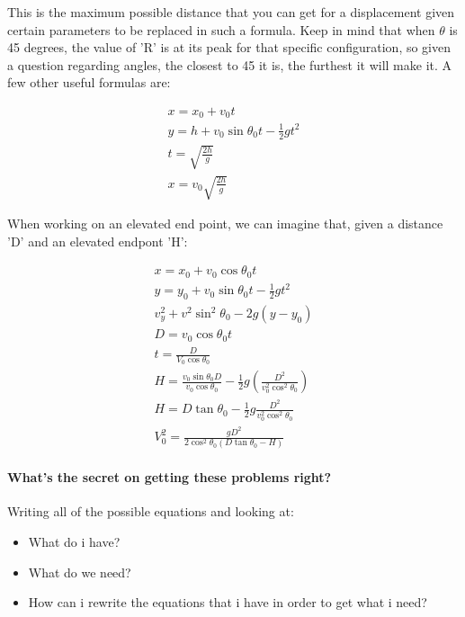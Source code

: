 \documentclass[11pt,fleqn]{book} %
\begin{document}
This is the maximum possible distance that you can get for a displacement given 
certain parameters to be replaced in such a formula. Keep in mind that when $\theta$ is 45 degrees, the
value of 'R' is at its peak for that specific configuration, so given a question regarding angles, the closest to
45 it is, the furthest it will make it. A few other useful formulas are:

\begin{gather}
    x = x_0 + v_0t \\
    y = h + v_0 \sin \theta_0 t - \frac{1}{2} gt^2 \\
    t = \sqrt{\frac{2h}{g}} \\
    x = v_0 \sqrt{\frac{2h}{g}}
\end{gather}

When working on an elevated end point, we can imagine that, given a distance 'D' and an elevated endpont 'H':

\begin{gather}
    x = x_0 + v_0 \cos \theta_0 t \\
    y = y_0 +v_0 \sin \theta_0 t - \frac{1}{2} gt^2 \\
    v_y^2 + v^2 \sin^2 \theta_0 -2g(y - y_0) \\
    D = v_0 \cos \theta_0 t \\ 
    t = \frac{D}{V_0 \cos \theta_0} \\
    H = \frac{v_0 \sin \theta_0 D}{v_0 \cos \theta_0} - \frac{1}{2} g (\frac{D^2}{v_0^2 \cos^2 \theta_0}) \\
    H = D \tan \theta_0 - \frac{1}{2} g \frac{D^2}{v_0^2 \cos^2 \theta_0} \\
    V_0^2 = \frac{gD^2}{2 \cos^2 \theta_0 (D \tan \theta_0 - H)}
\end{gather}

\paragraph*{What's the secret on getting these problems right?}

Writing all of the possible equations and looking at:

\begin{itemize}
    \item What do i have?
    \item What do we need?
    \item How can i rewrite the equations that i have in order to get what i need?
\end{itemize}
\end{document}
